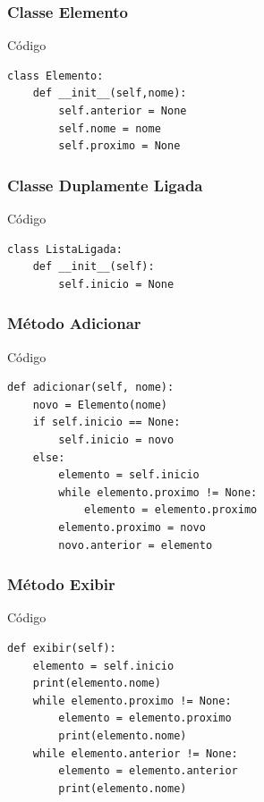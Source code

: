 \documentclass{beamer}
\begin{document}
\begin{frame}[fragile]
\frametitle{Classe Elemento}

\begin{exampleblock}{Código}
\begin{lstlisting}
class Elemento:
    def __init__(self,nome):
        self.anterior = None
        self.nome = nome
        self.proximo = None
\end{lstlisting}
\end{exampleblock}
\end{frame}

\begin{frame}[fragile]
\frametitle{Classe Duplamente Ligada}

\begin{exampleblock}{Código}
\begin{lstlisting}
class ListaLigada:
    def __init__(self):
        self.inicio = None
\end{lstlisting}
\end{exampleblock}
\end{frame}

\begin{frame}[fragile]
\frametitle{Método Adicionar}

\begin{exampleblock}{Código}
\begin{lstlisting}
def adicionar(self, nome):
    novo = Elemento(nome)
    if self.inicio == None:
        self.inicio = novo
    else:
        elemento = self.inicio
        while elemento.proximo != None:
            elemento = elemento.proximo
        elemento.proximo = novo
        novo.anterior = elemento
\end{lstlisting}
\end{exampleblock}
\end{frame}

\begin{frame}[fragile]
\frametitle{Método Exibir}

\begin{exampleblock}{Código}
\begin{lstlisting}
def exibir(self):
    elemento = self.inicio
    print(elemento.nome)
    while elemento.proximo != None:
        elemento = elemento.proximo
        print(elemento.nome)
    while elemento.anterior != None:
        elemento = elemento.anterior
        print(elemento.nome)
\end{lstlisting}
\end{exampleblock}
\end{frame}
\end{document}
